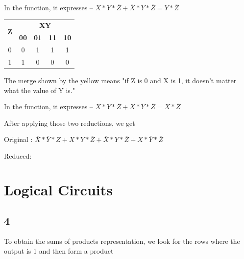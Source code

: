 \documentclass{article}
\newcommand{\boxedanswer}[1]{%

    \fbox{\large\textbf{#1}}%
}
\begin{document}
    \noindent
    In the function, it expresses -- $X * Y *\overline{Z} + \overline{X} * Y * \overline{Z} = Y * \overline{Z}$

    \begin{table}[h]
        \begin{tabular}{|c|c|c|c|c|}
            \hline
            \multirow{2}{*}{\textbf{Z}} & \multicolumn{4}{c|}{\textbf{XY}} \\
            \cline{2-5}
             & \textbf{00} & \textbf{01} & \textbf{11} & \textbf{10} \\
            \hline
            0 & 0& 1& \cellcolor{green}1& \cellcolor{green!}1\\

            \hline
            1 & 1& 0& 0& 0\\
            \hline
        \end{tabular}
    \end{table}
    \noindent
    The merge shown by the yellow means "if Z is 0 and X is 1, it doesn't matter what the value of Y is."

    \noindent
    In the function, it expresses -- $X*Y*\overline{Z} + X*\overline{Y}*\overline{Z} = X * \overline{Z}$

    \vspace*{0.1in}

    \noindent
    After applying those two reductions, we get

    \vspace*{0.1in}

    Original : $\overline{X} * \overline{Y} * Z + X * Y * \overline{Z} + \overline{X} * Y * \overline{Z} + X * \overline{Y} * \overline{Z}$

    \vspace*{0.1in}

    Reduced:
    \vspace*{0.1in}
    \boxedanswer{$Y*\overline{Z} + X * \overline{Z} + \overline{X}*\overline{Y} * Z$}

    \newpage

    \section*{Logical Circuits}

    \subsection*{4}

    To obtain the sums of products representation, we look for the rows where the output is 1 and then form a product 
    
\end{document}
